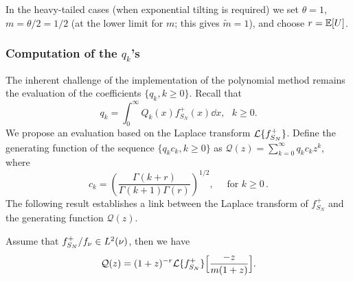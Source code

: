 In the heavy-tailed cases (\ie when exponential tilting is required) we set $\theta =1$, $m = \theta/2 = 1/2$ (at the lower limit for $m$; this gives $\widetilde{m}=1$), and choose $r = \mathbb E[U]$. 

\subsubsection{Computation of the $q_k$'s} \label{sssec:ComputingOrthogonalCoefficients}

The inherent challenge of the implementation of the polynomial method remains the evaluation of the coefficients $\{q_k, k\geq0\}$. Recall that
\begin{equation*}
q_{k}=\int_{0}^{\infty}Q_k(x)f_{S_N}^+(x)\dd x,\text{ }k\geq0.
\end{equation*}
We propose an evaluation based on the Laplace transform $\mathcal{L}\{f_{S_N}^+\}$. Define the generating function of the sequence $\{q_k c_k, k\geq0\}$ as $\mathcal{Q}(z)=\sum_{k=0}^{\infty}q_{k}c_{k}z^{k}$, where
\begin{equation*}\label{eq:ck}
c_k= \left(\frac{\Gamma(k+r)}{\Gamma(k+1)\Gamma(r)}\right)^{1/2}, \quad \text{ for }k\geq0 \,.
\end{equation*}
The following result establishes a link between the Laplace transform of $f_{S_N}^+$  and the generating function $\mathcal{Q}(z)$.
\begin{proposition}\label{prop:LaplaceTransformPolynomialRepresentation}
Assume that $f_{S_N}^+/f_{\nu}\in L^{2}(\nu)$, then we have
\begin{equation}\label{eq:CoefficientGeneratingFunctionToLaplaceTransforn}
\mathcal{Q}(z)=(1+z)^{-r}\mathcal{L}\{f_{S_N}^+\}\Big[\frac{-z}{m(1+z)}\Big].
\end{equation}
\end{proposition}
